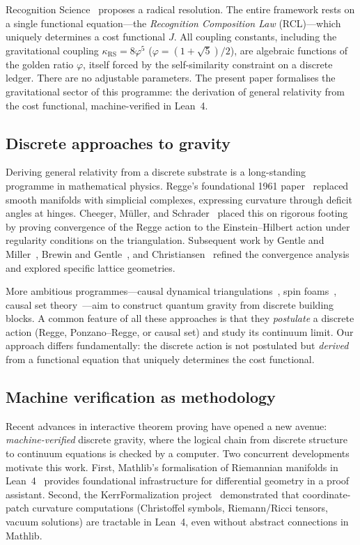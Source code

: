 \documentclass[11pt,a4paper]{article}
\newcommand{\vp}{\varphi}
\newcommand{\kRS}{\kappa_{\mathrm{RS}}}
\newcommand{\Jcost}{J}
\begin{document}
Recognition Science~\cite{WashburnZlatanovic2026} proposes a radical resolution.
The entire framework rests on a single functional equation---the \emph{Recognition Composition Law} (RCL)---which uniquely determines a cost functional $\Jcost$.
All coupling constants, including the gravitational coupling $\kRS = 8\vp^5$ ($\vp = (1+\sqrt{5})/2$), are algebraic functions of the golden ratio $\vp$, itself forced by the self-similarity constraint on a discrete ledger.
There are no adjustable parameters.
The present paper formalises the gravitational sector of this programme: the derivation of general relativity from the cost functional, machine-verified in Lean~4.

\subsection{Discrete approaches to gravity}

Deriving general relativity from a discrete substrate is a long-standing programme in mathematical physics.
Regge's foundational 1961 paper~\cite{Regge1961} replaced smooth manifolds with simplicial complexes, expressing curvature through deficit angles at hinges.
Cheeger, M\"uller, and Schrader~\cite{CheegerMullerSchrader1984} placed this on rigorous footing by proving convergence of the Regge action to the Einstein--Hilbert action under regularity conditions on the triangulation.
Subsequent work by Gentle and Miller~\cite{GentleMiller1998}, Brewin and Gentle~\cite{BrewinGentle2001}, and Christiansen~\cite{Christiansen2011} refined the convergence analysis and explored specific lattice geometries.

More ambitious programmes---causal dynamical triangulations~\cite{Ambjorn2012}, spin foams~\cite{Perez2013}, causal set theory~\cite{Sorkin2003}---aim to construct quantum gravity from discrete building blocks.
A common feature of all these approaches is that they \emph{postulate} a discrete action (Regge, Ponzano--Regge, or causal set) and study its continuum limit.
Our approach differs fundamentally: the discrete action is not postulated but \emph{derived} from a functional equation that uniquely determines the cost functional.

\subsection{Machine verification as methodology}

Recent advances in interactive theorem proving have opened a new avenue: \emph{machine-verified} discrete gravity, where the logical chain from discrete structure to continuum equations is checked by a computer.
Two concurrent developments motivate this work.
First, Mathlib's formalisation of Riemannian manifolds in Lean~4~\cite{Gouezel2025} provides foundational infrastructure for differential geometry in a proof assistant.
Second, the KerrFormalization project~\cite{Iqbal2026} demonstrated that coordinate-patch curvature computations (Christoffel symbols, Riemann/Ricci tensors, vacuum solutions) are tractable in Lean~4, even without abstract connections in Mathlib.
\end{document}
